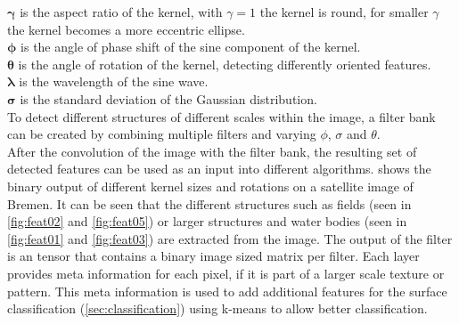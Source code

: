 \documentclass[12pt,a4paper, english,twoside]{scrartcl}
\begin{document}
      $\boldsymbol{\gamma}$ is the aspect ratio of the kernel, with $\gamma = 1$ the kernel is round, for smaller $\gamma$ the kernel becomes a more eccentric ellipse.\\
        $\boldsymbol{\phi}$ is the angle of phase shift of the sine component of the kernel. \\
        $\boldsymbol{\theta}$ is the angle of rotation of the kernel, detecting differently oriented features.\\
        $\boldsymbol{\lambda}$ is the wavelength of the sine wave. \\
        $\boldsymbol{\sigma}$ is the standard deviation of the Gaussian distribution.\\ 
      \noindent
      To detect different structures of different scales within the image, a filter bank can be created by combining multiple filters and varying $\phi$, $\sigma$ and $\theta$.\\
      After the convolution of the image with the filter bank, the resulting set of detected features can be used as an input into different algorithms.
       shows the binary output of different kernel sizes and rotations on a satellite image of Bremen. 
      It can be seen that the different structures such as fields (seen in \cref{fig:feat02} and \cref{fig:feat05}) or larger structures and water bodies (seen in \cref{fig:feat01} and \cref{fig:feat03}) are extracted from the image.
      The output of the filter is an tensor that contains a binary image sized matrix per filter. 
      Each layer provides meta information for each pixel, if it is part of a larger scale texture or pattern. 
      This meta information is used to add additional features for the surface classification (\cref{sec:classification}) using k-means %
      to allow better classification.%
\end{document}
